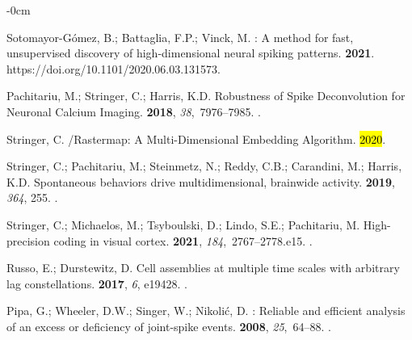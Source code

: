 \documentclass[brainsci, %
               review,accept,pdftex,moreauthors
               ]{Definitions/mdpi}
\begin{document}
\begin{adjustwidth}{-\extralength}{0cm}
\begin{thebibliography}{999}
Sotomayor-Gómez, B.; Battaglia, F.P.; Vinck, M.
: {A} method for fast, unsupervised discovery of
  high-dimensional neural spiking patterns.
 {\bf 2021}.
  {{https://doi.org/10.1101/2020.06.03.131573}}.

Pachitariu, M.; Stringer, C.; Harris, K.D.
\newblock Robustness of {Spike} {Deconvolution} for {Neuronal} {Calcium}
  {Imaging}.
 {\bf 2018}, {\em 38},~7976--7985.
.

Stringer, C.
/Rastermap: {A} Multi-Dimensional Embedding Algorithm.
  \hl{2020}. %


Stringer, C.; Pachitariu, M.; Steinmetz, N.; Reddy, C.B.; Carandini, M.;
  Harris, K.D.
\newblock Spontaneous behaviors drive multidimensional, brainwide activity.
 {\bf 2019}, {\em 364}, 255.
.

Stringer, C.; Michaelos, M.; Tsyboulski, D.; Lindo, S.E.; Pachitariu, M.
\newblock High-precision coding in visual cortex.
 {\bf 2021}, {\em 184},~2767--2778.e15.
.

Russo, E.; Durstewitz, D.
\newblock Cell assemblies at multiple time scales with arbitrary lag
  constellations.
 {\bf 2017}, {\em 6}, e19428.
.

Pipa, G.; Wheeler, D.W.; Singer, W.; Nikolić, D.
: Reliable and efficient analysis of an excess or
  deficiency of joint-spike events.
 {\bf 2008}, {\em
  25},~64--88.
.


\end{thebibliography}
\end{adjustwidth}
\end{document}
